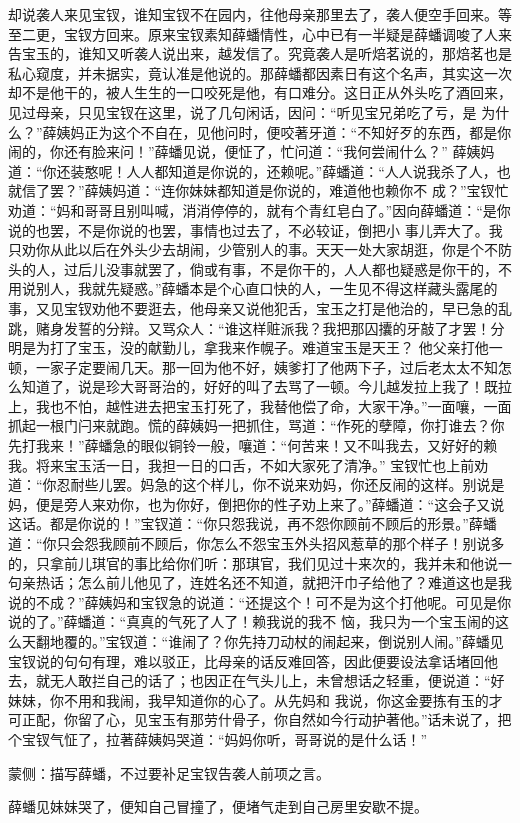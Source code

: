 \begin{parag}
    却说袭人来见宝钗，谁知宝钗不在园内，往他母亲那里去了，袭人便空手回来。等至二更，宝钗方回来。原来宝钗素知薛蟠情性，心中已有一半疑是薛蟠调唆了人来告宝玉的，谁知又听袭人说出来，越发信了。究竟袭人是听焙茗说的，那焙茗也是私心窥度，并未据实，竟认准是他说的。那薛蟠都因素日有这个名声，其实这一次却不是他干的，被人生生的一口咬死是他，有口难分。这日正从外头吃了酒回来，见过母亲，只见宝钗在这里，说了几句闲话，因问：“听见宝兄弟吃了亏，是 为什么？”薛姨妈正为这个不自在，见他问时，便咬著牙道：“不知好歹的东西，都是你闹的，你还有脸来问！”薛蟠见说，便怔了，忙问道：“我何尝闹什么？” 薛姨妈道：“你还装憨呢！人人都知道是你说的，还赖呢。”薛蟠道：“人人说我杀了人，也就信了罢？”薛姨妈道：“连你妹妹都知道是你说的，难道他也赖你不 成？”宝钗忙劝道：“妈和哥哥且别叫喊，消消停停的，就有个青红皂白了。”因向薛蟠道：“是你说的也罢，不是你说的也罢，事情也过去了，不必较证，倒把小 事儿弄大了。我只劝你从此以后在外头少去胡闹，少管别人的事。天天一处大家胡逛，你是个不防头的人，过后儿没事就罢了，倘或有事，不是你干的，人人都也疑惑是你干的，不用说别人，我就先疑惑。”薛蟠本是个心直口快的人，一生见不得这样藏头露尾的事，又见宝钗劝他不要逛去，他母亲又说他犯舌，宝玉之打是他治的，早已急的乱跳，赌身发誓的分辩。又骂众人：“谁这样赃派我？我把那囚攮的牙敲了才罢！分明是为打了宝玉，没的献勤儿，拿我来作幌子。难道宝玉是天王？ 他父亲打他一顿，一家子定要闹几天。那一回为他不好，姨爹打了他两下子，过后老太太不知怎么知道了，说是珍大哥哥治的，好好的叫了去骂了一顿。今儿越发拉上我了！既拉上，我也不怕，越性进去把宝玉打死了，我替他偿了命，大家干净。”一面嚷，一面抓起一根门闩来就跑。慌的薛姨妈一把抓住，骂道：“作死的孽障，你打谁去？你先打我来！”薛蟠急的眼似铜铃一般，嚷道：“何苦来！又不叫我去，又好好的赖我。将来宝玉活一日，我担一日的口舌，不如大家死了清净。” 宝钗忙也上前劝道：“你忍耐些儿罢。妈急的这个样儿，你不说来劝妈，你还反闹的这样。别说是妈，便是旁人来劝你，也为你好，倒把你的性子劝上来了。”薛蟠道：“这会子又说这话。都是你说的！”宝钗道：“你只怨我说，再不怨你顾前不顾后的形景。”薛蟠道：“你只会怨我顾前不顾后，你怎么不怨宝玉外头招风惹草的那个样子！别说多的，只拿前儿琪官的事比给你们听：那琪官，我们见过十来次的，我并未和他说一句亲热话；怎么前儿他见了，连姓名还不知道，就把汗巾子给他了？难道这也是我说的不成？”薛姨妈和宝钗急的说道：“还提这个！可不是为这个打他呢。可见是你说的了。”薛蟠道：“真真的气死了人了！赖我说的我不 恼，我只为一个宝玉闹的这么天翻地覆的。”宝钗道：“谁闹了？你先持刀动杖的闹起来，倒说别人闹。”薛蟠见宝钗说的句句有理，难以驳正，比母亲的话反难回答，因此便要设法拿话堵回他去，就无人敢拦自己的话了；也因正在气头儿上，未曾想话之轻重，便说道：“好妹妹，你不用和我闹，我早知道你的心了。从先妈和 我说，你这金要拣有玉的才可正配，你留了心，见宝玉有那劳什骨子，你自然如今行动护著他。”话未说了，把个宝钗气怔了，拉著薛姨妈哭道：“妈妈你听，哥哥说的是什么话！”\begin{note}蒙侧：描写薛蟠，不过要补足宝钗告袭人前项之言。\end{note}薛蟠见妹妹哭了，便知自己冒撞了，便堵气走到自己房里安歇不提。
\end{parag}



